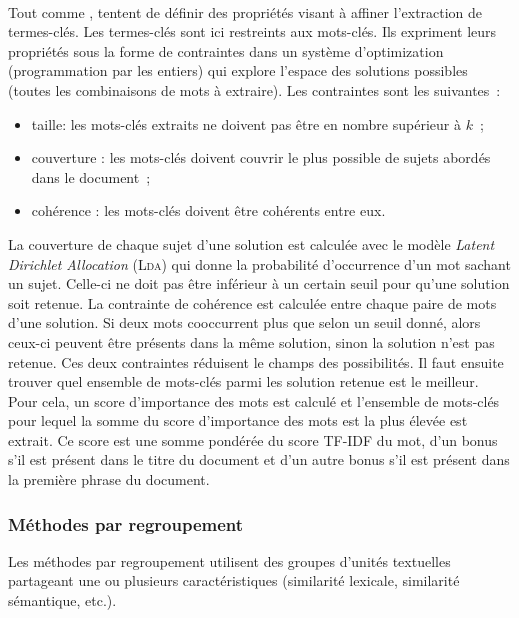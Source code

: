         \label{subsubsec:main-state_of_the_art-automatic_keyphrase_extraction-unsupervised_keyphrase_extraction-statistical_approaches:ilp}
        ~\\Tout comme ,
         tentent de définir des
        propriétés visant à affiner l'extraction de termes-clés. Les termes-clés
        sont ici restreints aux mots-clés. Ils expriment leurs propriétés sous
        la forme de contraintes dans un système d'optimization (programmation
        par les entiers) qui explore l'espace des solutions possibles (toutes
        les combinaisons de mots à extraire). Les contraintes sont les
        suivantes~:
        \begin{itemize}
          \item{taille: les mots-clés extraits ne doivent pas être en nombre
                supérieur à $k$~;}
          \item{couverture : les mots-clés doivent couvrir le plus possible de
                sujets abordés dans le document~;}
          \item{cohérence : les mots-clés doivent être cohérents entre eux.}
        \end{itemize}
        La couverture de chaque sujet d'une solution est calculée avec le modèle
        \textit{Latent Dirichlet Allocation} (\textsc{Lda}) \cite{blei2003lda}
        qui donne la probabilité d'occurrence d'un mot sachant un sujet.
        Celle-ci ne doit pas être inférieur à un certain seuil pour qu'une
        solution soit retenue. La contrainte de cohérence est calculée entre
        chaque paire de mots d'une solution. Si deux mots cooccurrent plus que
        selon un seuil donné, alors ceux-ci peuvent être présents dans la même
        solution, sinon la solution n'est pas retenue. Ces deux contraintes
        réduisent le champs des possibilités. Il faut ensuite trouver quel
        ensemble de mots-clés parmi les solution retenue est le meilleur. Pour
        cela, un score d'importance des mots est calculé et l'ensemble de
        mots-clés pour lequel la somme du score d'importance des mots est la
        plus élevée est extrait. Ce score est une somme pondérée du score TF-IDF
        du mot, d'un bonus s'il est présent dans le titre du document et d'un
        autre bonus s'il est présent dans la première phrase du document.

      \subsubsection{Méthodes par regroupement}
      \label{subsubsec:main-state_of_the_art-automatic_keyphrase_extraction-unsupervised_keyphrase_extraction-clustering_approaches}
        Les méthodes par regroupement utilisent des groupes d'unités textuelles
        partageant une ou plusieurs caractéristiques (similarité lexicale,
        similarité sémantique, etc.).

